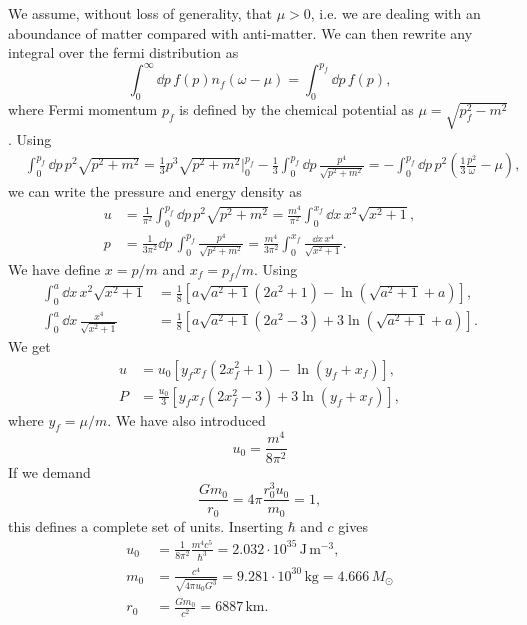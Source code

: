 We assume, without loss of generality, that $\mu >0$, i.e. we are dealing with an aboundance of matter compared with anti-matter.
We can then rewrite any integral over the fermi distribution as
%
\begin{equation}
    \int_0^\infty \dd p \, f(p) n_f(\omega - \mu) = \int_0^{p_f} \dd p \, f(p),
\end{equation}
%
where Fermi momentum $p_f$ is defined by the chemical potential as $\mu = \sqrt{p_f^2 - m^2}$.
Using
%
\begin{align}
    &
    \int_0^{p_f} \dd p \, p^2 \sqrt{p^2 + m^2}
     = \frac{1}{3} p^3 \sqrt{p^2 + m^2 }\bigg|_0^{p_f} 
    - \frac{1}{3}\int_0^{p_f} \dd p \, \frac{p^4}{\sqrt{p^2 + m^2}}
    =
    -
    \int_0^{p_f}
    \dd p \, p^2
    \left(
        \frac{1}{3}
        \frac{p^2}{\omega}
        - \mu
    \right),
\end{align}
%
we can write the pressure and energy density as
%
\begin{align}
    u &= \frac{1}{\pi^2} \int_0^{p_f} \dd p \,
    p^2 \sqrt{p^2 + m^2}
    = \frac{m^4}{\pi^2} \int_0^{x_f} \dd x \, x^2 \sqrt{x^2 + 1}, \\
    p & = \frac{1}{3 \pi^2} \dd p \, \int_0^{p_f}\frac{p^4}{\sqrt{p^2 + m^2}} 
    = \frac{m^4}{3 \pi^2} \int_0^{x_f} \frac{\dd x \, x^4}{\sqrt{x^2 + 1}}.
\end{align}
% 
We have define $x = p / m$ and $x_f = p_f/m$.
Using 
%
\begin{align}
    \int_0^a \dd x \, x^2 \sqrt{x^2 + 1} 
    & = \frac{1}{8} 
    \left[a \sqrt{a^2 + 1}(2 a^2 + 1) - \ln\left(\sqrt{a^2 + 1} + a\right)\right], \\
    \int_0^a \dd x \, \frac{x^4}{\sqrt{x^2 + 1} }
    & = \frac{1}{8} 
    \left[a \sqrt{a^2 + 1}(2 a^2 - 3) + 3\ln\left(\sqrt{a^2 + 1} + a\right)\right].
\end{align}
%
We get 
%
\begin{align}
    u &= u_0
    \left[y_f x_f (2x_f^2 + 1) - \ln\left(y_f + x_f\right)\right], \\
    P &= \frac{u_0}{3}
    \left[y_f x_f (2x_f^2 -3) + 3\ln\left(y_f + x_f\right)\right],
\end{align}
%
where $y_f = \mu / m$.
We have also introduced
%
\begin{equation}
    u_0 = \frac{m^4}{8 \pi^2}
\end{equation}
%
If we demand
%
\begin{equation}
    \frac{G m_0}{r_0} = 4 \pi \frac{r_0^3 u_0}{m_0} = 1,
\end{equation}
%
this defines a complete set of units.
Inserting $\hbar$ and $c$ gives
%
\begin{align}
    u_0 &= \frac{1}{8 \pi^2}\frac{m^4 c^5}{\hbar^3} 
    = 2.032\cdot10^{35}  \, \text{J}\,\text{m}^{-3}, \\
    m_0 &= \frac{c^4}{\sqrt{4 \pi u_0 G^3} } 
    = 9.281 \cdot 10^{30} \, \text{kg}
    = 4.666 \, M_\odot \\
    r_0 &= \frac{G m_0}{c^2} = 6887 \, \text{km}.
\end{align}

